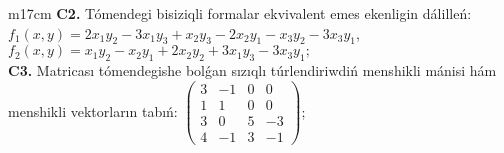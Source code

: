 \documentclass{article}
\begin{document}
\begin{tabular}{m{17cm}}
\textbf{C2.} Tómendegi bisiziqli formalar ekvivalent emes ekenligin dálilleń:\(f_{1}(x,y) = 2x_{1}y_{2} - 3x_{1}y_{3} + x_{2}y_{3} - 2x_{2}y_{1} - x_{3}y_{2} - 3x_{3}y_{1}\),\(f_{2}(x,y) = x_{1}y_{2} - x_{2}y_{1} + 2x_{2}y_{2} + 3x_{1}y_{3} - 3x_{3}y_{1};\) \\
\textbf{C3.} Matricası tómendegishe bolǵan sızıqlı túrlendiriwdiń menshikli mánisi hám menshikli vektorların tabıń: \(\begin{pmatrix} 3 & - 1 & 0 & 0 \\ 1 & 1 & 0 & 0 \\ 3 & 0 & 5 & - 3 \\ 4 & - 1 & 3 & - 1 \end{pmatrix}\); \\

\end{tabular}
\vspace{1cm}
\end{document}
